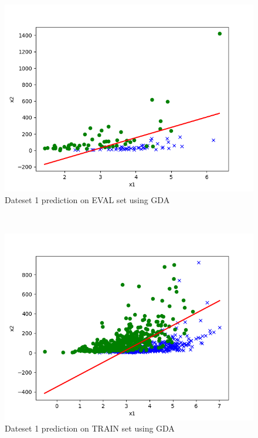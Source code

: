 \begin{answer}
\begin{figure}
  \includegraphics[width=\linewidth]{../src/output/p01e_pred_1_eval.png}
  \caption{Dateset 1 prediction on EVAL set using GDA}
  \label{fig:Dateset 1 prediction on EVAL set using GDA}
\end{figure}\\
\begin{figure}
  \includegraphics[width=\linewidth]{../src/output/p01e_pred_1_train.png}
  \caption{Dateset 1 prediction on TRAIN set using GDA}
  \label{fig:Dateset 1 prediction on TRAIN set using GDA}
\end{figure}\\
\end{answer}
